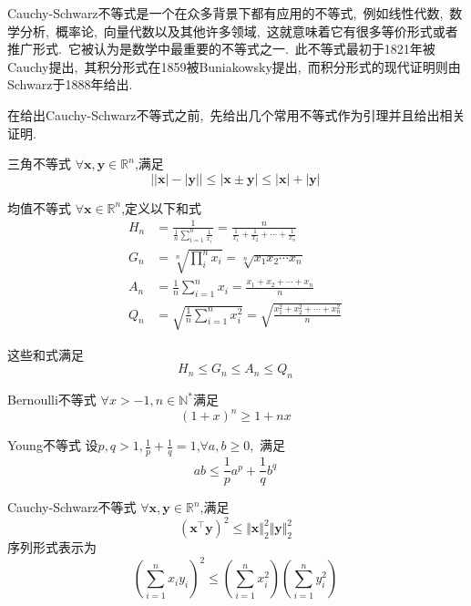 


Cauchy-Schwarz不等式是一个在众多背景下都有应用的不等式,\ 例如线性代数,\ 数学分析,\ 概率论,\ 向量代数以及其他许多领域,\ 这就意味着它有很多等价形式或者推广形式.\ 它被认为是数学中最重要的不等式之一.\ 此不等式最初于1821年被Cauchy提出,\ 其积分形式在1859被Buniakowsky提出,\ 而积分形式的现代证明则由Schwarz于1888年给出.\ 

在给出Cauchy-Schwarz不等式之前,\ 先给出几个常用不等式作为引理并且给出相关证明.\ 
\begin{lemma}{三角不等式}
$\forall \boldsymbol{x},\boldsymbol{y}\in\mathbb{R}^n$,满足
\begin{equation}
\lvert\lvert\boldsymbol{x}\rvert-\lvert\boldsymbol{y}\rvert\rvert\leqslant\lvert\boldsymbol{x}\pm\boldsymbol{y}\rvert\leqslant\lvert\boldsymbol{x}\rvert+\lvert\boldsymbol{y}\rvert~
\end{equation}
\end{lemma}
\begin{lemma}{均值不等式}
$\forall \boldsymbol{x}\in\mathbb{R}^n$,定义以下和式
\begin{align}
H_n&=\frac{1}{\frac{1}{n}\sum\limits_{i=1}^n\frac{1}{x_i}}=\frac{n}{\frac{1}{x_1}+\frac{1}{x_2}+\cdots+\frac{1}{x_n}}\\
G_n&=\sqrt[n]{\prod_{i}^n x_i}=\sqrt[n]{x_1x_2\cdots x_n}\\
A_n&=\frac{1}{n}\sum_{i=1}^n x_i=\frac{x_1+x_2+\cdots+x_n}{n}\\
Q_n&=\sqrt{\frac{1}{n}\sum_{i=1}^n x_i^2}=\sqrt{\frac{x_1^2+x_2^2+\cdots+x_n^2}{n}}~
\end{align}
\end{lemma}
这些和式满足
\begin{equation}
H_n\leqslant G_n\leqslant A_n \leqslant Q_n~
\end{equation}
\begin{lemma}{Bernoulli不等式}
$\forall x > -1,n \in \mathbb{N}^{\ast}$满足
\begin{equation}
(1+x)^n \geq 1+nx~
\end{equation}
\end{lemma}
\begin{lemma}{Young不等式}
设$p,q>1,\frac{1}{p}+\frac{1}{q}=1$,$\forall a,b\geqslant 0$,\ 满足 
\begin{equation}
a b \leqslant \frac{1}{p}a^{p}+\frac{1}{q}b^{q}~
\end{equation}
\end{lemma}
\begin{theorem}{Cauchy-Schwarz不等式}
$\forall \boldsymbol{x},\boldsymbol{y}\in\mathbb{R}^n$,满足
\begin{equation}
(\boldsymbol{x}^{\top}\boldsymbol{y})^2\leqslant \Vert \boldsymbol{x}\Vert_2^2\Vert \boldsymbol{y}\Vert_2^2~
\end{equation}
序列形式表示为
\begin{equation}
\left(\sum_{i=1}^{n}x_iy_i\right)^2\leqslant \left(\sum_{i=1}^nx_i^2\right)\left(\sum_{i=1}^ny_i^2\right)~
\end{equation}
\end{theorem}